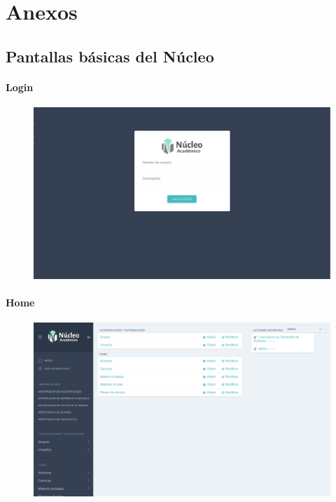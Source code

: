 \chapter{Anexos}

\section{Pantallas básicas del Núcleo}


\subsubsection{Login}
\begin{figure}[h!]
  \centering
    \includegraphics[scale=0.3]{images/nucleo/nucleo-login.png}
  \label{fig:nucleo-login}
\end{figure}

\subsubsection{Home}
\begin{figure}[h!]
  \centering
    \includegraphics[scale=0.3]{images/nucleo/nucleo-home.png}
  \label{fig:nucleo-home}
\end{figure}

